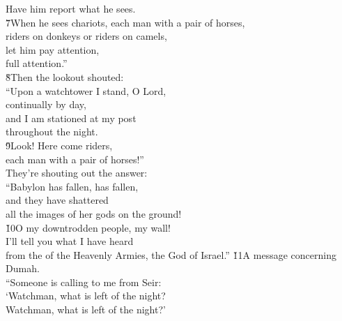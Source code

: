 \begin{poetry}
\poemlll       Have him report what he sees. \\
\poeml \v{7}When he sees chariots, each man with a pair of horses, \\
\poemll    riders on donkeys or riders on camels, \\
\poeml let him pay attention, \\
\poemll    full attention.'' \\
\poeml \v{8}Then the lookout shouted: \\
\poemll    ``Upon a watchtower I stand, O Lord, \\
\poemlll       continually by day, \\
\poeml and I am stationed at my post \\
\poemll    throughout the night. \\
\poeml \v{9}Look! Here come riders, \\
\poemll    each man with a pair of horses!'' \\
\poemlll       They're shouting out the answer: \\
\poeml ``Babylon has fallen, has fallen, \\
\poemll    and they have shattered \\
\poemlll       all the images of her gods on the ground! \\
\poeml \v{10}O my downtrodden people, my wall! \\
\poemll    I'll tell you what I have heard \\
\poemlll       from the  of the Heavenly Armies, the God of Israel.''
\poeml \v{11}A message concerning Dumah. \\
\poeml ``Someone is calling to me from Seir: \\
\poemll    `Watchman, what is left of the night? \\
\poemlll       Watchman, what is left of the night?' \\

\end{poetry}
